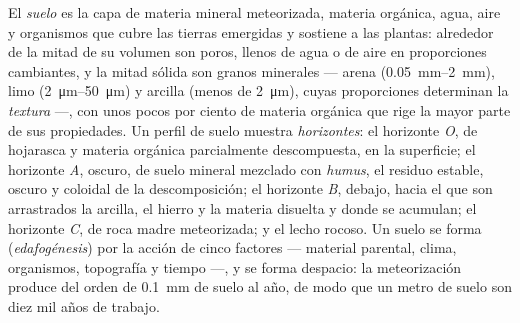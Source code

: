 \begin{definition}\label{def:b2:living-soil:soil}
El \emph{suelo} es la capa de materia mineral meteorizada, materia
orgánica, agua, aire y organismos que cubre las tierras emergidas y
sostiene a las plantas: alrededor de la mitad de su volumen son poros,
llenos de agua o de aire en proporciones cambiantes, y la mitad sólida son
granos minerales ---
arena (\qtyrange{0.05}{2}{mm}), limo (\qtyrange{2}{50}{\micro m}) y
arcilla (menos de \qty{2}{\micro m}), cuyas proporciones determinan la
\emph{textura} ---, con unos pocos por ciento de materia orgánica que
rige la mayor parte de sus propiedades. Un perfil de suelo muestra
\emph{horizontes}: el horizonte \emph{O}, de hojarasca y materia orgánica
parcialmente descompuesta, en la superficie; el horizonte \emph{A},
oscuro, de suelo mineral mezclado con \emph{humus}, el residuo estable,
oscuro y coloidal de la descomposición; el horizonte \emph{B}, debajo,
hacia el que son arrastrados la arcilla, el hierro y la materia disuelta y
donde se acumulan; el horizonte \emph{C}, de roca madre meteorizada; y
el lecho rocoso. Un suelo se forma (\emph{edafogénesis}) por la acción de
cinco factores --- material parental, clima, organismos, topografía y
tiempo ---, y se forma despacio: la meteorización produce del orden de
\qty{0.1}{mm} de suelo al año, de modo que un metro de suelo son diez mil
años de trabajo.
\end{definition}
